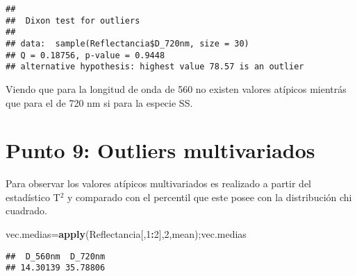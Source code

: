 \documentclass[
]{article}
\newenvironment{Shaded}{\begin{snugshade}}{\end{snugshade}}
\newcommand{\ControlFlowTok}[1]{\textcolor[rgb]{0.13,0.29,0.53}{\textbf{#1}}}
\newcommand{\DataTypeTok}[1]{\textcolor[rgb]{0.13,0.29,0.53}{#1}}
\newcommand{\DecValTok}[1]{\textcolor[rgb]{0.00,0.00,0.81}{#1}}
\newcommand{\KeywordTok}[1]{\textcolor[rgb]{0.13,0.29,0.53}{\textbf{#1}}}
\newcommand{\NormalTok}[1]{#1}
\newcommand{\OperatorTok}[1]{\textcolor[rgb]{0.81,0.36,0.00}{\textbf{#1}}}
\begin{document}
\begin{Shaded}
\end{Shaded}

\begin{verbatim}
## 
##  Dixon test for outliers
## 
## data:  sample(Reflectancia$D_720nm, size = 30)
## Q = 0.18756, p-value = 0.9448
## alternative hypothesis: highest value 78.57 is an outlier
\end{verbatim}

Viendo que para la longitud de onda de 560 no existen valores atípicos
mientrás que para el de 720 nm si para la especie SS.

\hypertarget{punto-9-outliers-multivariados}{%
\section{Punto 9: Outliers
multivariados}\label{punto-9-outliers-multivariados}}

Para observar los valores atípicos multivariados es realizado a partir
del estadístico T\(^2\) y comparado con el percentil que este posee con
la distribución chi cuadrado.

\begin{Shaded}
\begin{Highlighting}[]
\NormalTok{vec.medias=}\KeywordTok{apply}\NormalTok{(Reflectancia[,}\DecValTok{1}\OperatorTok{:}\DecValTok{2}\NormalTok{],}\DecValTok{2}\NormalTok{,mean);vec.medias}
\end{Highlighting}
\end{Shaded}

\begin{verbatim}
##  D_560nm  D_720nm 
## 14.30139 35.78806
\end{verbatim}

\begin{Shaded}
\end{Shaded}
\end{document}
